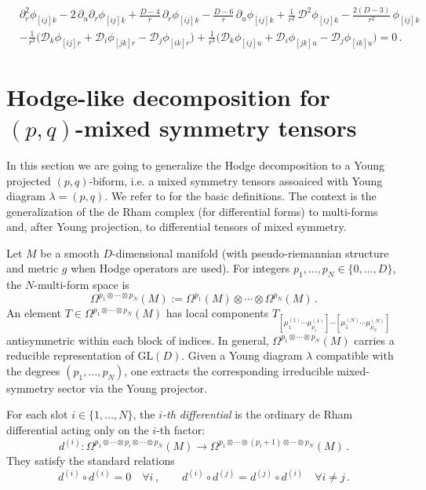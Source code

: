 \documentclass[a4paper,12pt]{article}
\begin{document}
\begin{equation}
\begin{aligned}
&\partial_r^2 \phi_{[ij]k}
-2\,\partial_u\partial_r \phi_{[ij]k}
+\frac{D-4}{r}\,\partial_r \phi_{[ij]k}
-\frac{D-6}{r}\,\partial_u \phi_{[ij]k}
+\frac{1}{r^2}\,\mathcal{D}^2 \phi_{[ij]k}
-\frac{2(D-3)}{r^2}\,\phi_{[ij]k}
\\
&
-\frac{1}{r^3}\Big(
\mathcal{D}_k \phi_{[ij]r}
+\mathcal{D}_i \phi_{[jk]r}
-\mathcal{D}_j \phi_{[ik]r}
\Big)
+\frac{1}{r^3}\Big(
\mathcal{D}_k \phi_{[ij]u}
+\mathcal{D}_i \phi_{[jk]u}
-\mathcal{D}_j \phi_{[ik]u}
\Big)=0 \, .
\end{aligned}
\end{equation}

\section{Hodge-like decomposition for $(p,q)$-mixed symmetry tensors}
In this section we are going to generalize the Hodge decomposition to a Young projected $(p,q)$-biform, i.e. a mixed symmetry tensors assoaiced with Young diagram $\lambda=(p,q)$. We refer to \cite{Manzoni:2025zmi} for the basic definitions. The context is the generalization of the de Rham complex (for differential forms) to multi-forms and, after Young projection, to differential tensors of mixed symmetry.

Let $M$ be a smooth $D$-dimensional manifold (with pseudo-riemannian structure and metric $g$ when Hodge operators are used).
For integers $p_1,\dots,p_N \in \{0,\dots,D\}$, the $N$-multi-form space is
\begin{equation}\label{eq:Nmultiform-space}
\Omega^{p_1\otimes\cdots\otimes p_N}(M)
:= \Omega^{p_1}(M)\otimes\cdots\otimes\Omega^{p_N}(M)\, .
\end{equation}
An element $T\in\Omega^{p_1\otimes\cdots\otimes p_N}(M)$ has local components
$T_{[\mu^{(1)}_1\cdots\mu^{(1)}_{p_1}]\cdots[\mu^{(N)}_1\cdots\mu^{(N)}_{p_N}]}$
antisymmetric within each block of indices. In general, $\Omega^{p_1\otimes\cdots\otimes p_N}(M)$ carries a reducible representation of $\mathrm{GL}(D)$.
Given a Young diagram $\lambda$ compatible with the degrees $(p_1,\dots,p_N)$, one extracts the corresponding irreducible mixed-symmetry sector via the Young projector.

For each slot $i\in\{1,\dots,N\}$, the \emph{$i$-th differential} is the ordinary de Rham differential acting only on the $i$-th factor:
\begin{equation}\label{eq:ith-differential}
d^{(i)}:\Omega^{p_1\otimes\cdots\otimes p_i\otimes\cdots\otimes p_N}(M)
\longrightarrow
\Omega^{p_1\otimes\cdots\otimes (p_i+1)\otimes\cdots\otimes p_N}(M)\, .
\end{equation}
They satisfy the standard relations
\begin{equation}\label{eq:commuting-differentials}
d^{(i)}\circ d^{(i)}=0\quad\forall i\, ,\qquad
d^{(i)}\circ d^{(j)}=d^{(j)}\circ d^{(i)}\quad\forall i\neq j\, .
\end{equation}
\end{document}
